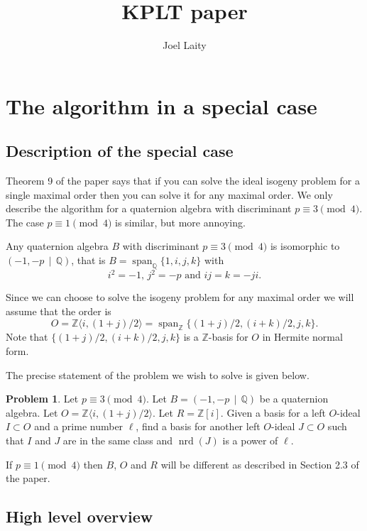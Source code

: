 \documentclass[10pt]{article}
\title{KPLT paper}
\author{Joel Laity}
\theoremstyle{plain}
\theoremstyle{definition}
\newtheorem{prob}[theorem]{Problem}
\newcommand{\op}{\operatorname}
\newcommand{\Z}{\mathbb{Z}}
\newcommand{\Q}{\mathbb{Q}}
\newcommand{\nrd}{\op{nrd}}
\begin{document}
\maketitle
\tableofcontents

\section{The algorithm in a special case}
\subsection{Description of the special case}

Theorem 9 of the paper says that if you can solve the ideal isogeny problem for a single maximal order then you can solve it for any maximal order.
We only describe the algorithm for a quaternion algebra with discriminant \( p \equiv 3 \pmod{4} \). The case \( p \equiv 1 \pmod{4} \) is similar, but more annoying.

Any quaternion algebra \( B \) with discriminant \( p \equiv 3 \pmod{4} \) is isomorphic to \( (-1, -p \, \mid \, \Q) \), that is \( B = \op{span}_\Q\{1, i, j, k\} \) with
\[
    i^2 = -1 \text{, } j^2 = -p \text{ and } ij = k = -ji .
\]

Since we can choose to solve the isogeny problem for any maximal order we will assume that the order is
\[
    O = \Z \langle i, (1+j) / 2 \rangle = \op{span}_\Z \{ (1+j) / 2, (i+k) / 2 , j, k \}.
\]
Note that \( \{ (1+j) / 2, (i+k) / 2 , j, k \} \) is a \( \Z \)-basis for \( O \) in Hermite normal form.

The precise statement of the problem we wish to solve is given below.

\begin{prob} \label{prob: general}
    Let \( p \equiv 3 \pmod{4} \).
    Let \( B =  (-1, -p \, \mid \, \Q) \) be a quaternion algebra.
    Let \( O = \Z \langle i, (1+j) / 2 \rangle \).
    Let \( R = \Z[i] \).
    Given a basis for a left \( O \)-ideal \( I \subset O \) and a prime number \( \ell \), find a basis for another left \( O \)-ideal \( J \subset O \) such that \( I \) and \( J \) are in the same class and \( \nrd(J) \) is a power of \( \ell \).
\end{prob}

If \( p \equiv 1 \pmod{4} \) then \( B \), \( O \) and \( R \) will be different as described in Section 2.3 of the paper.


\subsection{High level overview}
\end{document}
